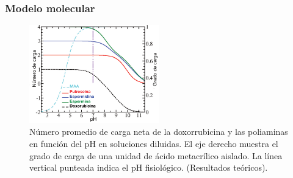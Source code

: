 
\subsubsection{Modelo molecular}


\begin{figure}[ht]
	\centering
	\includegraphics[width=0.5\textwidth]{Figures/graph-film/chargeAds.pdf}
	\caption{N\'umero promedio de carga neta de la doxorrubicina y las poliaminas en funci\'on del pH en soluciones diluidas.
		El eje derecho muestra el grado de carga de una unidad de \'acido metacr\'ilico aislado. La l\'inea vertical punteada indica el pH fisiol\'ogico. (Resultados te\'oricos).}
	\label{fig:film:model}
\end{figure}


